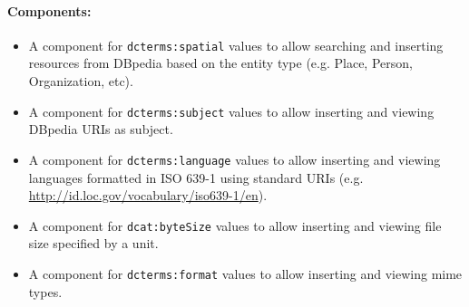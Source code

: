 \documentclass{acm_proc_article-sp}
\begin{document}
\paragraph{Components:}
\begin{itemize}
 \item A component for \texttt{dcterms:spatial} values to allow searching and inserting resources from DBpedia based on the entity type (e.g. Place, Person, Organization, etc).
 \item A component for \texttt{dcterms:subject} values to allow inserting and viewing DBpedia URIs as subject.
 \item A component for \texttt{dcterms:language} values to allow inserting and viewing languages formatted in ISO 639-1 using standard URIs (e.g. \\ \url{http://id.loc.gov/vocabulary/iso639-1/en}).
 \item A component for \texttt{dcat:byteSize} values to allow inserting and viewing file size specified by a unit.
  \item A component for \texttt{dcterms:format} values to allow inserting and viewing mime types.
\end{itemize}
\end{document}
